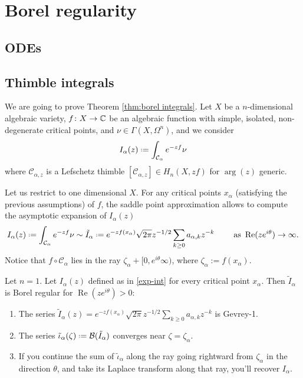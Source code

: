 \documentclass[11pt,a4paper,twoside,leqno,noamsfonts]{amsart}
\numberwithin{equation}{section}
\begin{document}
\section{Borel regularity}

\subsection{ODEs}

\subsection{Thimble integrals}
We are going to prove Theorem \ref{thm:borel integrals}. 
Let $X$ be a $n$-dimensional algebraic variety, $f\colon X\to\mathbb C$ be an algebraic function with simple, isolated, non-degenerate critical points, and $\nu\in\Gamma(X,\Omega^n)$, and we consider
\begin{equation}
I_{\alpha}(z)\defeq\int_{\mathcal{C}_\alpha}e^{-zf}\nu
\end{equation}
where $\mathcal{C}_{\alpha,z}$ is a Lefschetz thimble $[\mathcal{C}_{\alpha,z}]\in H_n(X,zf) $ for $\arg(z)$ generic. 


Let us restrict to one dimensional $X$. For any critical points $x_\alpha$ (satisfying the previous assumptions) of $f$, the saddle point approximation allows to compute the asymptotic expansion of $I_\alpha(z)$ 
\begin{equation}\label{exp-int}
I_{\alpha}(z)\defeq\int_{\mathcal{C}_\alpha}e^{-zf}\nu\sim \tilde{I}_{\alpha}\defeq e^{-zf(x_\alpha)}\sqrt{2\pi} z^{-1/2}\sum_{k\geq 0}a_{\alpha,k}z^{-k} \qquad \text{ as } \operatorname{Re} (ze^{i\theta})\to\infty.
\end{equation}
Notice that $f \circ \mathcal{C}_\alpha$ lies in the ray $\zeta_\alpha +[0, e^{i\theta}\infty)$, where $\zeta_\alpha := f(x_\alpha)$.

\begin{theorem}[Theorem ??]\label{thm:maxim} Let $n=1$. Let ${I}_{\alpha}(z)$ defined as in \eqref{exp-int} for every critical point $x_\alpha$. Then $\tilde{I}_\alpha$ is Borel regular for $\operatorname{Re}(ze^{i\theta})>0$:
\begin{enumerate}
\item\label{int:series-gevrey} The series $\tilde{I}_\alpha(z)=e^{-zf(x_\alpha)}\sqrt{2\pi} z^{-1/2}\sum_{k\geq 0}a_{\alpha,k}z^{-k}$ is Gevrey-1.
\item\label{int:resum-converges} The series $\tilde{\iota}_\alpha(\zeta)\defeq\mathcal{B}(\tilde{I}_\alpha)$ converges near $\zeta=\zeta_{\alpha}$.
\item\label{int:resum-valid} If you continue the sum of $\tilde{\iota}_\alpha$ along the ray going rightward from $\zeta_\alpha$ in the direction $\theta$, and take its Laplace transform along that ray, you'll recover $I_\alpha$.
\end{enumerate}
\end{theorem}
\end{document}
